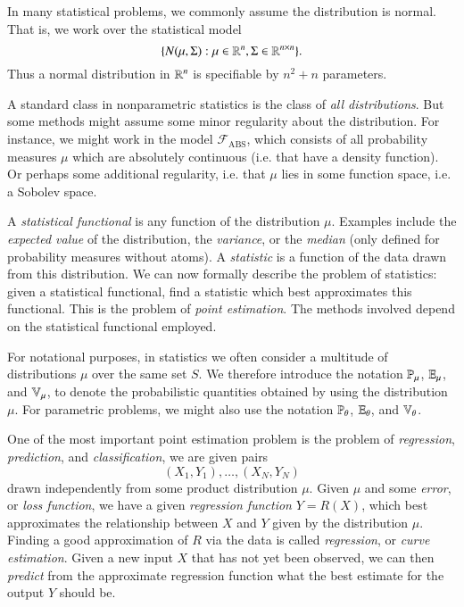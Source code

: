 \begin{example}
    In many statistical problems, we commonly assume the distribution is normal. That is, we work over the statistical model
    \[ \{ N(\mu,\Sigma): \mu \in \operatorname{\mathbb{R}}^n, \Sigma \in \operatorname{\mathbb{R}}^{n \times n} \}. \]
    Thus a normal distribution in $\operatorname{\mathbb{R}}^n$ is specifiable by $n^2 + n$ parameters.
\end{example}

\begin{example}
	A standard class in nonparametric statistics is the class of \emph{all distributions}. But some methods might assume some minor regularity about the distribution. For instance, we might work in the model $\mathcal{F}_{\text{ABS}}$, which consists of all probability measures $\mu$ which are absolutely continuous (i.e. that have a density function). Or perhaps some additional regularity, i.e. that $\mu$ lies in some function space, i.e. a Sobolev space.
\end{example}

A \emph{statistical functional} is any function of the distribution $\mu$. Examples include the \emph{expected value} of the distribution, the \emph{variance}, or the \emph{median} (only defined for probability measures without atoms). A \emph{statistic} is a function of the data drawn from this distribution. We can now formally describe the problem of statistics: given a statistical functional, find a statistic which best approximates this functional. This is the problem of \emph{point estimation}. The methods involved depend on the statistical functional employed.

For notational purposes, in statistics we often consider a multitude of distributions $\mu$ over the same set $S$. We therefore introduce the notation $\operatorname{\mathbb{P}}_\mu$, $\operatorname{\mathbb{E}}_\mu$, and $\operatorname{\mathbb{V}}_\mu$, to denote the probabilistic quantities obtained by using the distribution $\mu$. For parametric problems, we might also use the notation $\operatorname{\mathbb{P}}_\theta$, $\operatorname{\mathbb{E}}_\theta$, and $\operatorname{\mathbb{V}}_\theta$.

One of the most important point estimation problem is the problem of \emph{regression}, \emph{prediction}, and \emph{classification}, we are given pairs
%
\[ (X_1,Y_1),\dots,(X_N,Y_N) \]
%
drawn independently from some product distribution $\mu$. Given $\mu$ and some \emph{error}, or \emph{loss function}, we have a given \emph{regression function} $Y = R(X)$, which best approximates the relationship between $X$ and $Y$ given by the distribution $\mu$. Finding a good approximation of $R$ via the data is called \emph{regression}, or \emph{curve estimation}. Given a new input $X$ that has not yet been observed, we can then \emph{predict} from the approximate regression function what the best estimate for the output $Y$ should be.

